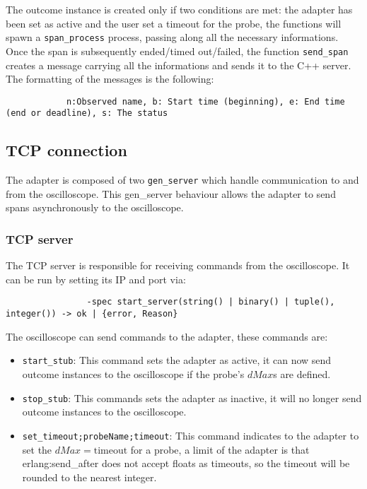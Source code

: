             The outcome instance is created only if two conditions are met: the adapter has been set as active and the user set a timeout for the probe, the functions will spawn a \texttt{span\_process} process, passing along all the necessary informations. \\
        Once the span is subsequently ended/timed out/failed, the function \texttt{send\_span} creates a message carrying all the informations and sends it to the C++ server. The formatting of the messages is the following:
        \begin{verbatim}
            n:Observed name, b: Start time (beginning), e: End time (end or deadline), s: The status
        \end{verbatim}

    \subsection{TCP connection}
        The adapter is composed of two \texttt{gen\_server} which handle communication to and from the oscilloscope. This gen\_server behaviour allows the adapter to send spans asynchronously to the oscilloscope.

        \subsubsection{TCP server}
            The TCP server is responsible for receiving commands from the oscilloscope. It can be run by setting its IP and port via:
            \begin{verbatim}
                -spec start_server(string() | binary() | tuple(), integer()) -> ok | {error, Reason}
            \end{verbatim}
            The oscilloscope can send commands to the adapter, these commands are:
            \begin{itemize}
                \item \texttt{start\_stub}: This command sets the adapter as active, it can now send outcome instances to the oscilloscope if the probe's $dMax$s are defined.
                \item \texttt{stop\_stub}: This commands sets the adapter as inactive, it will no longer send outcome instances to the oscilloscope.
                \item \texttt{set\_timeout;probeName;timeout}: This command indicates to the adapter to set the $dMax = \text{timeout}$ for a probe, a limit of the adapter is that erlang:send\_after does not accept floats as timeouts, so the timeout will be rounded to the nearest integer.
            \end{itemize}


